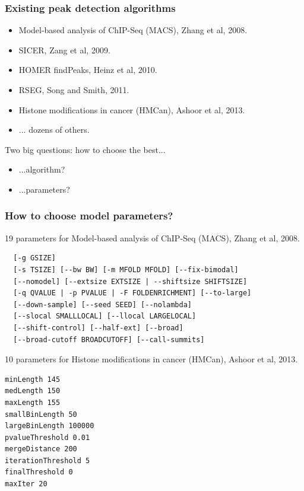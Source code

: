 \documentclass{beamer}
\begin{document}
\begin{frame}
  \frametitle{Existing peak detection algorithms}
  \begin{itemize}
  \item Model-based analysis of ChIP-Seq (MACS), Zhang et al, 2008.
  \item SICER, Zang et al, 2009.
  \item HOMER findPeaks, Heinz et al, 2010.
  \item RSEG, Song and Smith, 2011.
  \item Histone modifications in cancer (HMCan), Ashoor et al, 2013.
  \item ... dozens of others.
  \end{itemize}
  Two big questions: how to choose the best...
  \begin{itemize}
  \item ...algorithm?
  \item ...parameters?
  \end{itemize}
\end{frame}

\begin{frame}[fragile]
  \frametitle{How to choose model parameters?}
\scriptsize
19 parameters for Model-based analysis of ChIP-Seq (MACS), Zhang et al, 2008.
\begin{verbatim}
  [-g GSIZE]
  [-s TSIZE] [--bw BW] [-m MFOLD MFOLD] [--fix-bimodal]
  [--nomodel] [--extsize EXTSIZE | --shiftsize SHIFTSIZE]
  [-q QVALUE | -p PVALUE | -F FOLDENRICHMENT] [--to-large]
  [--down-sample] [--seed SEED] [--nolambda]
  [--slocal SMALLLOCAL] [--llocal LARGELOCAL]
  [--shift-control] [--half-ext] [--broad]
  [--broad-cutoff BROADCUTOFF] [--call-summits]
\end{verbatim}
10 parameters for Histone modifications in cancer (HMCan),
Ashoor et al, 2013.
\begin{verbatim}
minLength 145
medLength 150
maxLength 155
smallBinLength 50
largeBinLength 100000
pvalueThreshold 0.01
mergeDistance 200
iterationThreshold 5
finalThreshold 0
maxIter 20
\end{verbatim}
\end{frame}
\end{document}
